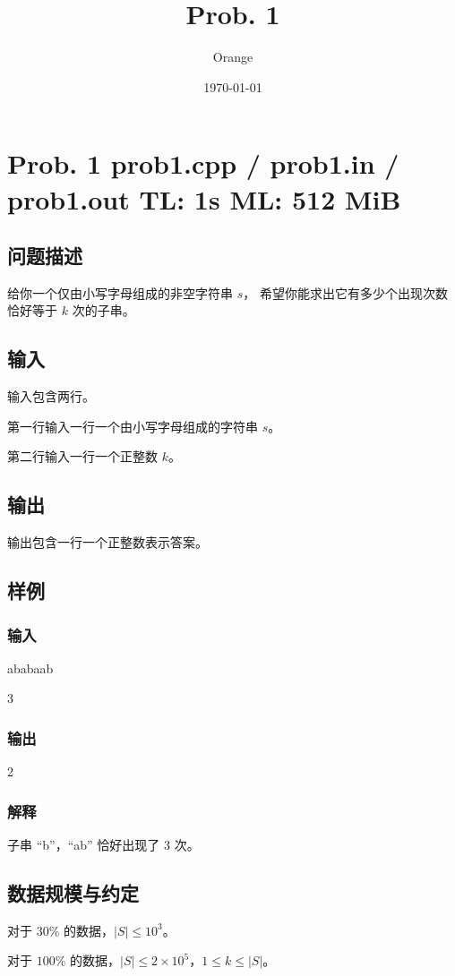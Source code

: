 \documentclass[UTF8]{article}
\title{Prob. 1}
\author{Orange}
\date{\today}
\begin{document}
	\heiti

	\section{Prob. 1 \small {prob1.cpp / prob1.in / prob1.out} TL: 1s ML: 512 MiB}

	\subsection{问题描述}

	给你一个仅由小写字母组成的非空字符串 $s$，
	希望你能求出它有多少个出现次数恰好等于 $k$ 次的子串。

	\subsection{输入}

	输入包含两行。

	第一行输入一行一个由小写字母组成的字符串 $s$。

	第二行输入一行一个正整数 $k$。

	\subsection{输出}

	输出包含一行一个正整数表示答案。

	\subsection{样例}

	\subsubsection{输入}

	ababaab

	3

	\subsubsection{输出}

	2

	\subsubsection{解释}

	子串 ``b''，``ab'' 恰好出现了 3 次。

	\subsection{数据规模与约定}

	对于 $30\%$ 的数据，$|S| \le 10^3$。

	对于 $100\%$ 的数据，$|S| \le 2 \times 10^5$，$1 \le k \le |S|$。
\end{document}
